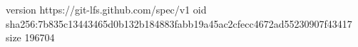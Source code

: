 version https://git-lfs.github.com/spec/v1
oid sha256:7b835c13443465d0b132b184883fabb19a45ac2cfecc4672ad55230907f43417
size 196704
